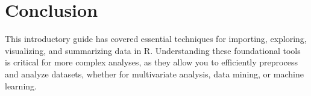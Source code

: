 \documentclass{article}
\begin{document}
\section{Conclusion}
This introductory guide has covered essential techniques for importing, exploring, visualizing, and summarizing data in R. Understanding these foundational tools is critical for more complex analyses, as they allow you to efficiently preprocess and analyze datasets, whether for multivariate analysis, data mining, or machine learning.
\end{document}
